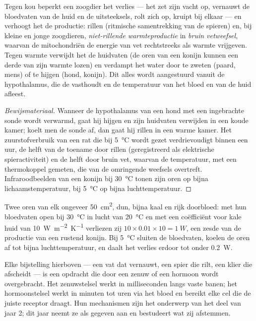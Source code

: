 \begin{proposition}\label{prop:b1:mammal-organization:thermoreg}
Tegen kou beperkt een zoogdier het verlies --- het zet zijn vacht op, vernauwt
de bloedvaten van de huid en de uitsteeksels, rolt zich op, kruipt bij elkaar ---
en verhoogt het de productie: rillen (ritmische samentrekking van de spieren)
en, bij kleine en jonge zoogdieren, \emph{niet-rillende
warmteproductie} in \emph{bruin
vetweefsel}, waarvan de mitochondriën de energie van
vet rechtstreeks als warmte vrijgeven. Tegen warmte verwijdt het de huidvaten
(de oren van een konijn kunnen een derde van zijn warmte lozen) en verdampt het
water door te zweten (paard, mens) of te hijgen (hond, konijn). Dit alles wordt
aangestuurd vanuit de hypothalamus, die de  vasthoudt en de
temperatuur van het bloed en van de huid afleest.
\end{proposition}
\begin{proof}[Bewijsmateriaal]
Wanneer de hypothalamus van een hond met een ingebrachte sonde wordt verwarmd,
gaat hij hijgen en zijn huidvaten verwijden in een koude kamer; koelt men de
sonde af, dan gaat hij rillen in een warme kamer. Het zuurstofverbruik van een
rat die bij \qty{5}{\celsius} wordt gezet verdrievoudigt binnen een uur, de
helft van de toename door rillen (geregistreerd als elektrische spieractiviteit)
en de helft door bruin vet, waarvan de temperatuur, met een thermokoppel
gemeten, die van de omringende weefsels overtreft. Infraroodbeelden van een
konijn bij \qty{30}{\celsius} tonen zijn oren op bijna lichaamstemperatuur, bij
\qty{5}{\celsius} op bijna luchttemperatuur.
\end{proof}

\begin{example}\label{ex:b1:mammal-organization:ears}
Twee oren van elk ongeveer \qty{50}{cm^2}, dun, bijna kaal en rijk doorbloed:
met hun bloedvaten open bij \qty{30}{\celsius} in lucht van \qty{20}{\celsius} en
met een coëfficiënt voor kale huid van \qty{10}{W.m^{-2}.K^{-1}} verliezen zij
$10\times 0.01\times 10 =
\qty{1}{W}$, een zesde van de productie van een rustend konijn. Bij
\qty{5}{\celsius} sluiten de bloedvaten, koelen de oren af tot bijna
luchttemperatuur, en daalt het verlies erdoor tot onder \qty{0.2}{W}.
\end{example}

\begin{remark}[Afstemming]\label{rem:b1:mammal-organization:coordination}
Elke bijstelling hierboven --- een vat dat vernauwt, een spier die rilt, een
klier die afscheidt --- is een opdracht die door een zenuw of een hormoon wordt
overgebracht. Het zenuwstelsel werkt in milliseconden langs vaste banen; het
hormoonstelsel werkt in minuten tot uren via het bloed en bereikt elke cel die
de juiste receptor draagt. Hun mechanismen zijn het onderwerp van het deel van
jaar 2; dit jaar neemt ze als gegeven aan en bestudeert wat zij afstemmen.
\end{remark}

